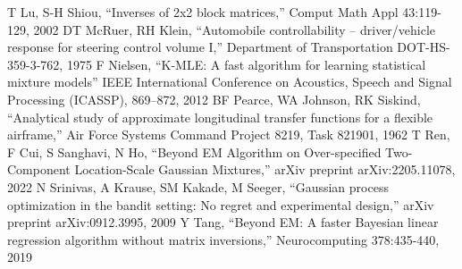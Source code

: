 \documentclass[letterpaper, 10 pt, conference]{ieeeconf}
\begin{document}
\begin{thebibliography}{00}
 T Lu, S-H Shiou, ``Inverses of 2x2 block matrices,'' Comput Math Appl 43:119-129, 2002
 DT McRuer, RH Klein, ``Automobile controllability -- driver/vehicle response for steering control volume I,'' Department of Transportation DOT-HS-359-3-762, 1975
 F Nielsen, ``K-MLE: A fast algorithm for learning statistical mixture models'' IEEE International Conference on Acoustics, Speech and Signal Processing (ICASSP), 869–872, 2012
 BF Pearce, WA Johnson, RK Siskind, ``Analytical study of approximate longitudinal transfer functions for a flexible airframe,'' Air Force Systems Command Project 8219, Task 821901, 1962
 T Ren, F Cui, S Sanghavi, N Ho, ``Beyond EM Algorithm on Over-specified Two-Component Location-Scale Gaussian Mixtures,'' arXiv preprint arXiv:2205.11078, 2022
 N Srinivas, A Krause, SM Kakade, M Seeger, ``Gaussian process optimization in the bandit setting: No regret and experimental design,'' arXiv preprint arXiv:0912.3995, 2009
 Y Tang, ``Beyond EM: A faster Bayesian linear regression algorithm without matrix inversions,'' Neurocomputing 378:435-440, 2019
\end{thebibliography}
\end{document}
